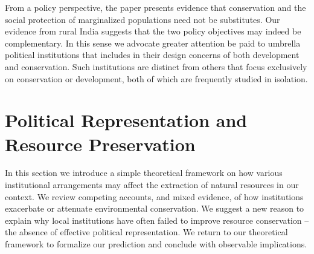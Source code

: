 \documentclass[12pt,reqno]{article}
\begin{document}
From a policy perspective, the paper presents evidence that conservation and the social protection of marginalized populations need not be substitutes. Our evidence from rural India suggests that the two policy objectives may indeed be complementary. In this sense we advocate greater attention be paid to umbrella political institutions that includes in their design concerns of both development and conservation. Such institutions are distinct from others that focus exclusively on conservation or development, both of which are frequently studied in isolation.



\section{Political Representation and Resource Preservation} %
\label{sec:conceptual_framework}

In this section we introduce a simple theoretical framework on how various institutional arrangements may affect the extraction of natural resources in our context. We review competing accounts, and mixed evidence, of how institutions exacerbate or attenuate environmental conservation. We suggest a new reason to explain why local institutions have often failed to improve resource conservation -- the absence of effective political representation. We return to our theoretical framework to formalize our prediction and conclude with observable implications. 
\end{document}
